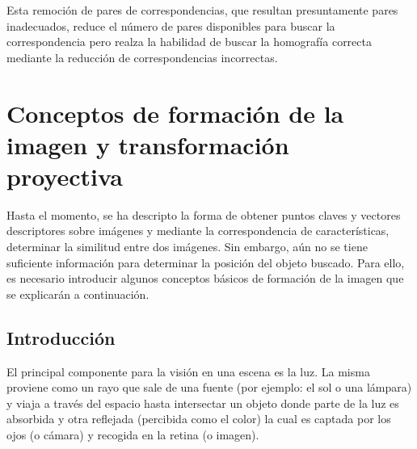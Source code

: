 Esta remoción de pares de correspondencias, que resultan presuntamente pares inadecuados, reduce el número de pares disponibles para buscar la correspondencia pero realza la habilidad de buscar la homografía correcta mediante la reducción de correspondencias incorrectas.
\section[Formación de la imagen y transformación proyectiva]{Conceptos de formación de la imagen y transformación proyectiva}
Hasta el momento, se ha descripto la forma de obtener puntos claves y vectores descriptores sobre imágenes y mediante la correspondencia de características, determinar la similitud entre dos imágenes. Sin embargo, aún no se tiene suficiente información para determinar la posición del objeto buscado. Para ello, es necesario introducir algunos conceptos básicos de formación de la imagen que se explicarán a continuación.
\subsection{Introducción}
El principal componente para la visión en una escena es la luz. La misma proviene como un rayo que sale de una fuente (por ejemplo: el sol o una lámpara) y viaja a través del espacio hasta intersectar un objeto donde parte de la luz es absorbida y otra reflejada (percibida como el color) la cual es captada por los ojos (o cámara) y recogida en la retina (o imagen).

